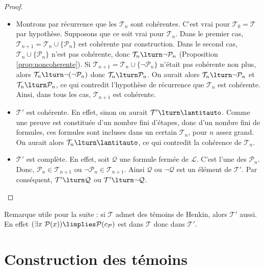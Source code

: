 \documentclass[11pt,class=report,crop=false]{standalone}
\begin{document}
\begin{proof}
	~
	\begin{itemize}
		
		\item Montrons par récurrence que les $\mathcal{T}_n$ sont cohérentes.
		C'est vrai pour $\mathcal{T}_0 = \mathcal{T}$ par hypothèse.
		Supposons que ce soit vrai pour $\mathcal{T}_n$.
		Dans le premier cas, $\mathcal{T}_{n+1} = \mathcal{T}_n \cup \{\mathcal{P}_n\}$ est cohérente par construction.
		Dans le second cas, $\mathcal{T}_n \cup \{\mathcal{P}_n\}$ n'est pas cohérente, donc $\mathcal{T}_n \lturn \lnot \mathcal{P}_n$ (Proposition \ref{prop:noncoherente}). Si $\mathcal{T}_{n+1} = \mathcal{T}_n \cup \{\lnot \mathcal{P}_n\}$ n'était pas cohérente non plus, alors $\mathcal{T}_n \lturn \lnot(\lnot \mathcal{P}_n)$ donc $\mathcal{T}_n \lturn \mathcal{P}_n$.
		On aurait alors $\mathcal{T}_n \lturn \lnot \mathcal{P}_n$ et $\mathcal{T}_n \lturn \mathcal{P}_n$, ce qui contredit l'hypothèse de récurrence que $\mathcal{T}_n$ est cohérente.
		Ainsi, dans tous les cas, $\mathcal{T}_{n+1}$ est cohérente.
		
		
		\item $\mathcal{T}'$ est cohérente. En effet, sinon on aurait $\mathcal{T}' \lturn \lantitauto$. Comme une preuve est constituée d'un nombre fini d'étapes, donc d'un nombre fini de formules, ces formules sont incluses dans un certain $\mathcal{T}_n$, pour $n$ assez grand. On aurait alors $\mathcal{T}_n \lturn \lantitauto$, ce qui contredit la cohérence de $\mathcal{T}_n$.
		
		\item $\mathcal{T}'$ est complète. En effet, soit $\mathcal{Q}$ une formule fermée de $\mathcal{L}$. C'est l'une des $\mathcal{P}_n$. Donc, $\mathcal{P}_n \in \mathcal{T}_{n+1}$ ou $\lnot \mathcal{P}_n \in \mathcal{T}_{n+1}$. Ainsi $\mathcal{Q}$ ou $\lnot \mathcal{Q}$ est un élément de $\mathcal{T}'$. Par conséquent, $\mathcal{T}' \lturn \mathcal{Q}$ ou $\mathcal{T}' \lturn \lnot \mathcal{Q}$.
	\end{itemize}
\end{proof}

Remarque utile pour la suite : si $\mathcal{T}$ admet des témoins de Henkin, alors $\mathcal{T}'$ aussi. En effet \og{}$(\exists x\ \mathcal{P}(x)) \limplies \mathcal{P}(c_{\mathcal{P}})$\fg{} est dans $\mathcal{T}$ donc dans $\mathcal{T}'$.


\section{Construction des témoins}
\label{sec:temoins}
\end{document}
